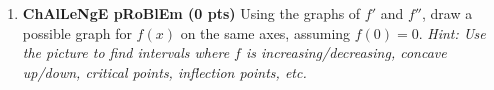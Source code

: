 \documentclass[12pt,letterpaper]{article}
\begin{document}
\begin{enumerate}[1.]
\newpage
\vspace{20pc}
\item {\bf ChAlLeNgE pRoBlEm (0 pts)} Using the graphs of $f'$ and $f''$, draw a possible graph for $f(x)$ on the same axes, assuming $f(0)=0$.  {\it Hint: Use the picture to find intervals where $f$ is increasing/decreasing, concave up/down, critical points, inflection points, etc.} 

\vspace{2pc}
\end{enumerate}
\end{document}
